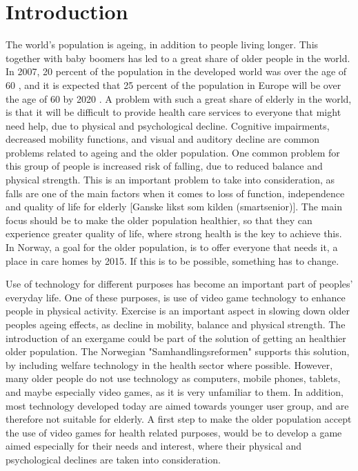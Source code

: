 \chapter{Introduction}

The world's population is ageing, in addition to people living longer. This together with baby boomers has led to a great share of older people in the world. In 2007, 20 percent of the population in the developed world was over the age of 60 \cite{dickinson2007methods}, and it is expected that 25 percent of the population in Europe will be over the age of 60 by 2020 \cite{ijsselsteijn2007digital}. A problem with such a great share of elderly in the world, is that it will be difficult to provide health care services to everyone that might need help, due to physical and psychological decline. Cognitive impairments, decreased mobility functions, and visual and auditory decline are common problems related to ageing and the older population. One common problem for this group of people is increased risk of falling, due to reduced balance and physical strength. This is an important problem to take into consideration, as falls are one of the main factors when it comes to loss of function, independence and quality of life for elderly [Ganske likst som kilden (smartsenior)]. The main focus should be to make the older population healthier, so that they can experience greater quality of life, where strong health is the key to achieve this. In Norway, a goal for the older population, is to offer everyone that needs it, a place in care homes by 2015. If this is to be possible, something has to change.     

Use of technology for different purposes has become an important part of peoples' everyday life. One of these purposes, is use of video game technology to enhance people in physical activity. Exercise is an important aspect in slowing down older peoples ageing effects, as decline in mobility, balance and physical strength. The introduction of an exergame could be part of the solution of getting an healthier older population. The Norwegian "Samhandlingsreformen" supports this solution, by including welfare technology in the health sector where possible. However, many older people do not use technology as computers, mobile phones, tablets, and maybe especially video games, as it is very unfamiliar to them. In addition, most technology developed today are aimed towards younger user group, and are therefore not suitable for elderly. A first step to make the older population accept the use of video games for health related purposes, would be to develop a game aimed especially for their needs and interest, where their physical and psychological declines are taken into consideration. 

